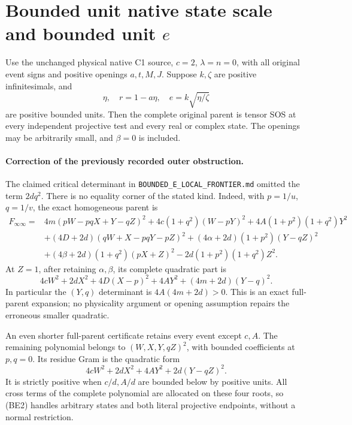 \section[Bounded unit native state scale and bounded unit e]{Bounded unit native state scale and bounded unit $e$}

\begin{theorem}
Use the unchanged physical native C1 source, $c=2$, $\lambda=n=0$,
with all original event signs and positive openings $a,t,M,J$.
Suppose $k,\zeta$ are positive infinitesimals, and
\[
 \eta,\quad r=1-a\eta,\quad e=k\sqrt{\eta/\zeta}
\]
are positive bounded units. Then the complete original parent is tensor
SOS at every independent projective test and every real or complex state.
The openings may be arbitrarily small, and $\beta=0$ is included.
\end{theorem}

\paragraph{Correction of the previously recorded outer obstruction.}
The claimed critical determinant in \texttt{BOUNDED\_E\_LOCAL\_FRONTIER.md}
omitted the term $2dq^2$. There is no equality corner of the stated kind.
Indeed, with $p=1/u$, $q=1/v$, the exact homogeneous parent is
\begin{align*}
F_{\infty\infty}={}&4m(pW-pqX+Y-qZ)^2
 +4c(1+q^2)(W-pY)^2+4A(1+p^2)(1+q^2)Y^2\\
&+(4D+2d)(qW+X-pqY-pZ)^2
 +(4\alpha+2d)(1+p^2)(Y-qZ)^2\\
&+(4\beta+2d)(1+q^2)(pX+Z)^2
 -2d(1+p^2)(1+q^2)Z^2.
\end{align*}
At $Z=1$, after retaining $\alpha,\beta$, its complete quadratic part is
\[
 4cW^2+2dX^2+4D(X-p)^2+4AY^2+(4m+2d)(Y-q)^2.
 \tag{BE1}
\]
In particular the $(Y,q)$ determinant is $4A(4m+2d)>0$.
This is an exact full-parent expansion; no physicality argument or
opening assumption repairs the erroneous smaller quadratic.

An even shorter full-parent certificate retains every event except
$c,A$. The remaining polynomial belongs to $(W,X,Y,qZ)^2$, with bounded
coefficients at $p,q=0$. Its residue Gram is the quadratic form
\[
 4cW^2+2dX^2+4AY^2+2d(Y-qZ)^2.                 \tag{BE2}
\]
It is strictly positive when $c/d,A/d$ are bounded below by positive
units. All cross terms of the complete polynomial are allocated on
these four roots, so (BE2) handles arbitrary states and both literal
projective endpoints, without a normal restriction.


